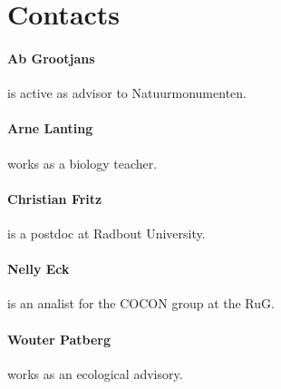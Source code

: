 \documentclass[12pt,a4paper,draft]{article}\usepackage[]{graphicx}\usepackage[]{color}
\begin{document}
\section{Contacts}

\paragraph{Ab Grootjans} is active as advisor to Natuurmonumenten.

\paragraph{Arne Lanting} works as a biology teacher.

\paragraph{Christian Fritz} is a postdoc at Radbout University.

\paragraph{Nelly Eck} is an analist for the COCON group at the RuG.

\paragraph{Wouter Patberg} works as an ecological advisory. 

\listoffixmes



\end{document}
